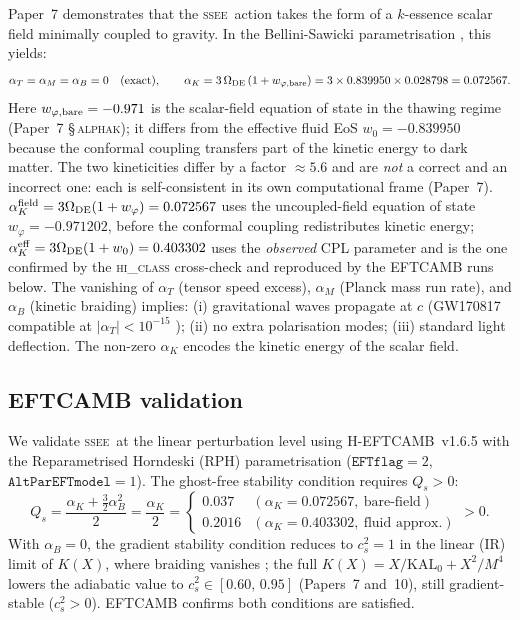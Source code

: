 \documentclass[12pt,a4paper]{article}
\newcommand{\SSEE}{\textsc{ssee}}
\newcommand{\KAL}{\mathrm{KAL}_0}
\newcommand{\Omde}{\Omega_{\mathrm{DE}}}
\newcommand{\alphaK}{\alpha_K}
\newcommand{\alphaB}{\alpha_B}
\newcommand{\alphaM}{\alpha_M}
\newcommand{\alphaT}{\alpha_T}
\begin{document}
Paper~7 \citep{AlmeidaSSEE2026P7} demonstrates that the \SSEE\ action takes
the form of a $k$-essence scalar field minimally coupled to gravity.
In the Bellini-Sawicki parametrisation \citep{Bellini2015}, this yields:
\begin{equation}
  \alphaT = \alphaM = \alphaB = 0 \quad (\text{exact}),
  \qquad
  \alphaK = 3\,\Omde\,(1+w_{\varphi,\rm bare}) = 3\times0.839950\times0.028798 = 0.072567.
  \label{eq:alphas}
\end{equation}
Here $w_{\varphi,\rm bare} = -0.971$ is the scalar-field equation of state in the
thawing regime (Paper~7 \S\,\textsc{alphak}); it differs from the effective fluid
EoS $w_0 = -0.839950$ because the conformal coupling transfers part of the kinetic
energy to dark matter.
The two kineticities differ by a factor $\approx5.6$ and are \emph{not} a
correct and an incorrect one: each is self-consistent in its own computational
frame (Paper~7). $\alphaK^{\rm field} = 3\Omde(1+w_\varphi) = 0.072567$ uses the
uncoupled-field equation of state $w_\varphi=-0.971202$, before the conformal
coupling redistributes kinetic energy; $\alphaK^{\rm eff} = 3\Omde(1+w_0) =
0.403302$ uses the \emph{observed} CPL parameter and is the one confirmed by the
\textsc{hi\_class} cross-check and reproduced by the EFTCAMB runs below.
The vanishing of $\alphaT$ (tensor speed excess), $\alphaM$ (Planck mass run rate),
and $\alphaB$ (kinetic braiding) implies: (i) gravitational waves propagate at $c$
(GW170817 compatible at $|\alphaT| < 10^{-15}$ \citep{GW170817,Monitor2017});
(ii) no extra polarisation modes; (iii) standard light deflection.
The non-zero $\alphaK$ encodes the kinetic energy of the scalar field.

\subsection{EFTCAMB validation}
\label{sec:eftcamb}

We validate \SSEE\ at the linear perturbation level using H-EFTCAMB~v1.6.5
\citep{HuSawicki2014} with the Reparametrised Horndeski (RPH) parametrisation
($\texttt{EFTflag}=2$, $\texttt{AltParEFTmodel}=1$).
The ghost-free stability condition requires $Q_s > 0$:
\begin{equation}
  Q_s = \frac{\alphaK + \frac{3}{2}\alphaB^2}{2} = \frac{\alphaK}{2}
  = \begin{cases} 0.037 & (\alphaK = 0.072567,\ \text{bare-field}) \\ 0.2016 & (\alphaK = 0.403302,\ \text{fluid approx.}) \end{cases} > 0.
  \label{eq:Qs}
\end{equation}
With $\alphaB = 0$, the gradient stability condition reduces to $c_s^2 = 1$ in the
linear (IR) limit of $K(X)$, where braiding vanishes \citep{Bellini2015}; the full
$K(X)=X/\KAL+X^2/M^4$ lowers the adiabatic value to $c_s^2 \in [0.60,\,0.95]$
(Papers~7 and~10), still gradient-stable ($c_s^2>0$).
EFTCAMB confirms both conditions are satisfied.
\end{document}
